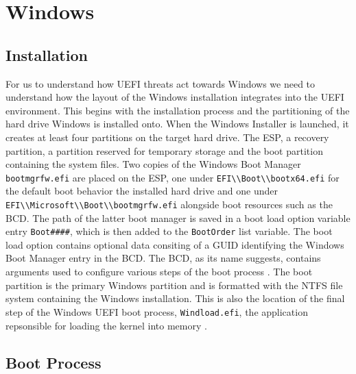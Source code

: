 
\section{Windows}



\subsection{Installation}

For us to understand how UEFI threats act towards Windows we need to understand how the layout of the Windows installation integrates into the UEFI environment.
This begins with the installation process and the partitioning of the hard drive Windows is installed onto.
When the Windows Installer is launched, it creates at least four partitions on the target hard drive.
The \acf{ESP}, a recovery partition, a partition reserved for temporary storage and the boot partition containing the system files.
Two copies of the Windows Boot Manager \lstinline{bootmgrfw.efi} are placed on the \ac{ESP}, one under \lstinline{EFI\\Boot\\bootx64.efi} for the default boot behavior the installed hard drive and one under \lstinline{EFI\\Microsoft\\Boot\\bootmgrfw.efi} alongside boot resources such as the \ac{BCD}. The path of the latter boot manager is saved in a boot load option variable entry \lstinline{Boot####}, which is then added to the \lstinline{BootOrder} list variable. The boot load option contains optional data consiting of a GUID identifying the Windows Boot Manager entry in the \ac{BCD}. The \ac{BCD}, as its name suggests, contains arguments used to configure various steps of the boot process \cite[12. The Windows Boot Manager]{windows-internals-7-part2}. The boot partition is the primary Windows partition and is formatted with the \ac{NTFS} file system containing the Windows installation. This is also the location of the final step of the Windows UEFI boot process, \lstinline{Windload.efi}, the application repsonsible for loading the kernel into memory \cite[12. The Windows OS Loader]{windows-internals-7-part2}.

\subsection{Boot Process}

